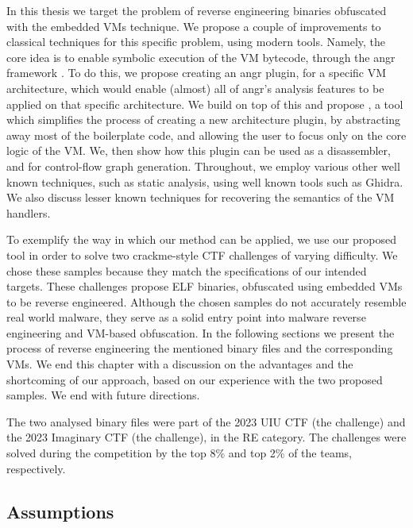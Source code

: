 In this thesis we target the problem of reverse engineering binaries obfuscated with the embedded \glspl{VM} technique. We propose a couple of improvements to classical techniques for this specific problem, using modern tools. Namely, the core idea is to enable symbolic execution of the VM bytecode, through the angr framework \cite{angr}. To do this, we propose creating an angr plugin, for a specific VM architecture, which would enable (almost) all of angr's analysis features to be applied on that specific architecture. We build on top of this and propose , a tool which simplifies the process of creating a new architecture plugin, by abstracting away most of the boilerplate code, and allowing the user to focus only on the core logic of the \gls{VM}. We, then show how this plugin can be used as a disassembler, and for control-flow graph generation. Throughout, we employ various other well known techniques, such as static analysis, using well known tools such as Ghidra. We also discuss lesser known techniques for recovering the semantics of the \gls{VM} handlers.

To exemplify the way in which our method can be applied, we use our proposed tool in order to solve two crackme-style \gls{CTF} challenges of varying difficulty. We chose these samples because they match the specifications of our intended targets. These challenges propose \gls{ELF} binaries, obfuscated using embedded \glspl{VM} to be reverse engineered. Although the chosen samples do not accurately resemble real world malware, they serve as a solid entry point into malware reverse engineering and \gls{VM}-based obfuscation. In the following sections we present the process of reverse engineering the mentioned binary files and the corresponding \glspl{VM}. We end this chapter with a discussion on the advantages and the shortcoming of our approach, based on our experience with the two proposed samples. We end with future directions.

The two analysed binary files were part of the 2023 UIU CTF (the  challenge) \cite{uiu2023} and the 2023 Imaginary CTF \cite{ictf2023} (the  challenge), in the \gls{RE} category. The challenges were solved during the competition by the top 8\% and top 2\% of the teams, respectively.

\subsection{Assumptions}

